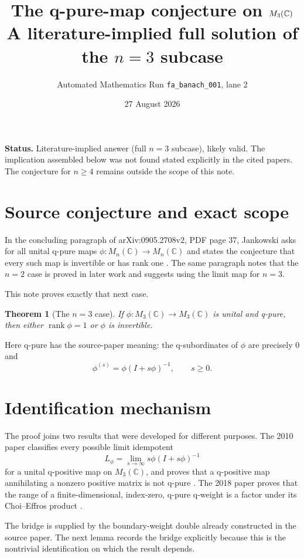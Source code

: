\documentclass[11pt]{article}
\title{The q-pure-map conjecture on $M_3(\C)$\\
\large A literature-implied full solution of the $n=3$ subcase}
\author{Automated Mathematics Run \texttt{fa\_banach\_001}, lane 2}
\date{27 August 2026}
\newtheorem{theorem}{Theorem}
\newcommand{\C}{\mathbb C}
\newcommand{\rank}{\operatorname{rank}}
\begin{document}
\maketitle

\noindent\colorbox{statusbg}{\parbox{0.94\textwidth}{%
\textbf{Status.} Literature-implied answer (full $n=3$ subcase), likely valid.
The implication assembled below was not found stated explicitly in the cited papers.
The conjecture for $n\geq4$ remains outside the scope of this note.}}

\section{Source conjecture and exact scope}

In the concluding paragraph of arXiv:0905.2708v2, PDF page 37,
Jankowski asks for all unital q-pure maps $\phi:M_n(\C)\to M_n(\C)$ and
states the conjecture that every such map is invertible or has rank one
\cite{Jankowski2009}.  The same paragraph notes that the $n=2$ case is
proved in later work and suggests using the limit map for $n=3$.

This note proves exactly that next case.

\begin{theorem}[The $n=3$ case]\label{thm:main}
If $\phi:M_3(\C)\to M_3(\C)$ is unital and q-pure, then either
$\rank\phi=1$ or $\phi$ is invertible.
\end{theorem}

Here q-pure has the source-paper meaning: the q-subordinates of $\phi$ are
precisely $0$ and
\[
  \phi^{(s)}=\phi(I+s\phi)^{-1},\qquad s\geq0.
\]

\section{Identification mechanism}

The proof joins two results that were developed for different purposes.
The 2010 paper classifies every possible limit idempotent
\[
  L_\phi=\lim_{s\to\infty}s\phi(I+s\phi)^{-1}
\]
for a unital q-positive map on $M_3(\C)$, and proves that a q-positive map
annihilating a nonzero positive matrix is not q-pure
\cite[Theorem 3.9, Corollary 3.10, Proposition 4.5]{Jankowski2010}.
The 2018 paper proves that the range of a finite-dimensional, index-zero,
q-pure q-weight is a factor under its Choi--Effros product
\cite[Theorem 5.7]{JMP2018}.

The bridge is supplied by the boundary-weight double already constructed in
the source paper.  The next lemma records the bridge explicitly because this
is the nontrivial identification on which the result depends.
\end{document}

